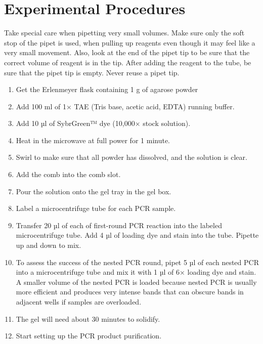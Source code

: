\documentclass[]{book}
\providecommand{\tightlist}{%
  \setlength{\itemsep}{0pt}\setlength{\parskip}{0pt}}
\theoremstyle{definition}
\theoremstyle{definition}
\theoremstyle{definition}
\theoremstyle{remark}
\let\BeginKnitrBlock\begin \let\EndKnitrBlock\end
\begin{document}
\section{Experimental Procedures}\label{experimental-procedures-12}

\BeginKnitrBlock{rmdnote}
Take special care when pipetting very small volumes. Make sure only the
soft stop of the pipet is used, when pulling up reagents even though it
may feel like a very small movement. Also, look at the end of the pipet
tip to be sure that the correct volume of reagent is in the tip. After
adding the reagent to the tube, be sure that the pipet tip is empty.
Never reuse a pipet tip.
\EndKnitrBlock{rmdnote}

\begin{enumerate}
\def\labelenumi{\arabic{enumi}.}
\setcounter{enumi}{1}
\tightlist
\item
  Get the Erlenmeyer flask containing 1 g of agarose powder
\item
  Add 100 ml of 1× TAE (Tris base, acetic acid, EDTA) running buffer.
\item
  Add 10 µl of SybrGreen™ dye (10,000× stock solution).
\item
  Heat in the microwave at full power for 1 minute.
\item
  Swirl to make sure that all powder has dissolved, and the solution is
  clear.
\item
  Add the comb into the comb slot.
\item
  Pour the solution onto the gel tray in the gel box.
\item
  Label a microcentrifuge tube for each PCR sample.
\item
  Transfer 20 µl of each of first-round PCR reaction into the labeled
  microcentrifuge tube. Add 4 µl of loading dye and stain into the tube.
  Pipette up and down to mix.
\item
  To assess the success of the nested PCR round, pipet 5 µl of each
  nested PCR into a microcentrifuge tube and mix it with 1 µl of 6×
  loading dye and stain. A smaller volume of the nested PCR is loaded
  because nested PCR is usually more efficient and produces very intense
  bands that can obscure bands in adjacent wells if samples are
  overloaded.
\item
  The gel will need about 30 minutes to solidify.
\item
  Start setting up the PCR product purification.
\end{enumerate}
\end{document}
